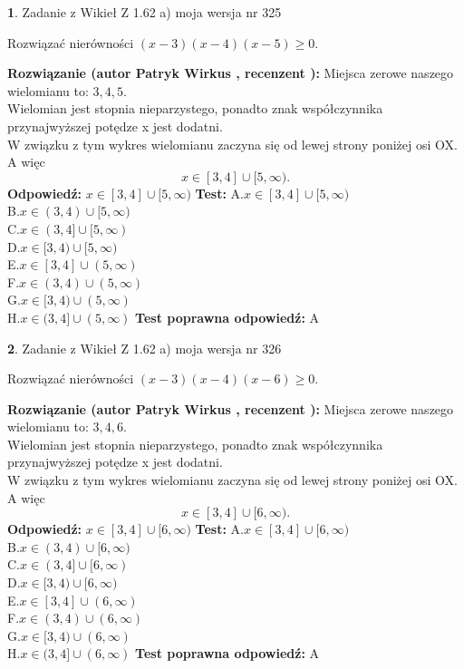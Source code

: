 \documentclass[12pt, a4paper]{article}
\theoremstyle{definition} %
\newtheorem{zad}{}
\newcommand{\zadStart}[1]{\begin{zad}#1\newline}
\newcommand{\zadStop}{\end{zad}}
\newcommand{\rozwStart}[2]{\noindent \textbf{Rozwiązanie (autor #1 , recenzent #2): }\newline}
\newcommand{\rozwStop}{\newline}
\newcommand{\odpStart}{\noindent \textbf{Odpowiedź:}\newline}
\newcommand{\odpStop}{\newline}
\newcommand{\testStart}{\noindent \textbf{Test:}\newline}
\newcommand{\testStop}{\newline}
\newcommand{\kluczStart}{\noindent \textbf{Test poprawna odpowiedź:}\newline}
\newcommand{\kluczStop}{\newline}
\begin{document}
\zadStart{Zadanie z Wikieł Z 1.62 a) moja wersja nr 325}

Rozwiązać nierówności $(x-3)(x-4)(x-5)\ge0$.
\zadStop
\rozwStart{Patryk Wirkus}{}
Miejsca zerowe naszego wielomianu to: $3, 4, 5$.\\
Wielomian jest stopnia nieparzystego, ponadto znak współczynnika przy\linebreak najwyższej potędze x jest dodatni.\\ W związku z tym wykres wielomianu zaczyna się od lewej strony poniżej osi OX. A więc $$x \in [3,4] \cup [5,\infty).$$
\rozwStop
\odpStart
$x \in [3,4] \cup [5,\infty)$
\odpStop
\testStart
A.$x \in [3,4] \cup [5,\infty)$\\
B.$x \in (3,4) \cup [5,\infty)$\\
C.$x \in (3,4] \cup [5,\infty)$\\
D.$x \in [3,4) \cup [5,\infty)$\\
E.$x \in [3,4] \cup (5,\infty)$\\
F.$x \in (3,4) \cup (5,\infty)$\\
G.$x \in [3,4) \cup (5,\infty)$\\
H.$x \in (3,4] \cup (5,\infty)$
\testStop
\kluczStart
A
\kluczStop



\zadStart{Zadanie z Wikieł Z 1.62 a) moja wersja nr 326}

Rozwiązać nierówności $(x-3)(x-4)(x-6)\ge0$.
\zadStop
\rozwStart{Patryk Wirkus}{}
Miejsca zerowe naszego wielomianu to: $3, 4, 6$.\\
Wielomian jest stopnia nieparzystego, ponadto znak współczynnika przy\linebreak najwyższej potędze x jest dodatni.\\ W związku z tym wykres wielomianu zaczyna się od lewej strony poniżej osi OX. A więc $$x \in [3,4] \cup [6,\infty).$$
\rozwStop
\odpStart
$x \in [3,4] \cup [6,\infty)$
\odpStop
\testStart
A.$x \in [3,4] \cup [6,\infty)$\\
B.$x \in (3,4) \cup [6,\infty)$\\
C.$x \in (3,4] \cup [6,\infty)$\\
D.$x \in [3,4) \cup [6,\infty)$\\
E.$x \in [3,4] \cup (6,\infty)$\\
F.$x \in (3,4) \cup (6,\infty)$\\
G.$x \in [3,4) \cup (6,\infty)$\\
H.$x \in (3,4] \cup (6,\infty)$
\testStop
\kluczStart
A
\kluczStop
\end{document}
